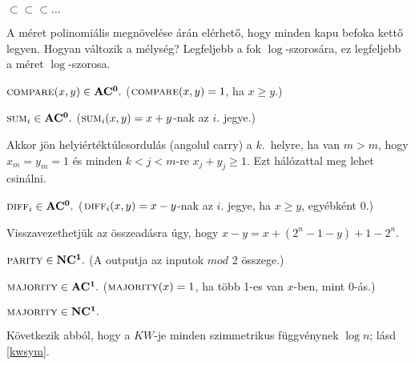 \begin{Exercise}[counter={sorszam}, difficulty=0]
	$\subset$$\subset$$\subset\ldots$
\end{Exercise}	
\begin{Answer}
	A méret polinomiális megnövelése árán elérhet\H o, hogy minden kapu befoka kett\H o legyen.
	Hogyan v\'altozik a m\'elys\'eg? Legfeljebb a fok $\log$-szoros\'ara, ez legfeljebb a m\'eret $\log$-szorosa.
\end{Answer}

\begin{Exercise}[counter={sorszam}, difficulty=0]
	$\la{Compare}(x,y) \in \ACnull.$ ($\la{Compare}(x,y)=1$, ha $x\geq y$.)
\end{Exercise}

\begin{Exercise}[counter={sorszam}, difficulty=0]
	$\la{Sum}_i \in \ACnull.$
	($\la{Sum}_i(x,y)=x+y$-nak az $i$. jegye.)
\end{Exercise}
\begin{Answer}
	Akkor j\"on helyiértéktúlcsordulás (angolul carry) a $k$.\ helyre, ha van $m>m$, hogy $x_m=y_m=1$ \'es minden $k<j<m$-re $x_j+y_j\ge 1$. Ezt h\'al\'ozattal meg lehet csin\'alni.
\end{Answer}

\begin{Exercise}[counter={sorszam}, difficulty=0]
	$\la{Diff}_i \in \ACnull.$
	($\la{Diff}_i(x,y)=x-y$-nak az $i$. jegye, ha $x\ge y$, egy\'ebk\'ent 0.)
\end{Exercise}
\begin{Answer}
	Visszavezethetj\"uk az \"osszead\'asra \'ugy, hogy $x-y=x+(2^n-1-y)+1-2^n$.
\end{Answer}

\begin{Exercise}[counter={sorszam}, difficulty=0]
	$\la{Parity} \in \cl{NC^1}.$
	(A  outputja az inputok $mod$ 2 összege.)
\end{Exercise}

\begin{Exercise}[counter={sorszam}, difficulty=0]
	$\la{Majority} \in \cl{AC^1}.$
	($\la{Majority}(x)=1$, ha t\"obb 1-es van $x$-ben, mint 0-\'as.)
\end{Exercise}

\begin{Exercise}[counter={sorszam}, difficulty=1]
	$\la{Majority} \in \cl{NC^1}.$
\end{Exercise}
\begin{Answer}
	K\"ovetkezik abb\'ol, hogy a $KW$-je minden szimmetrikus f\"uggv\'enynek $\log n$; l\'asd \ref{kwsym}.
\end{Answer}

